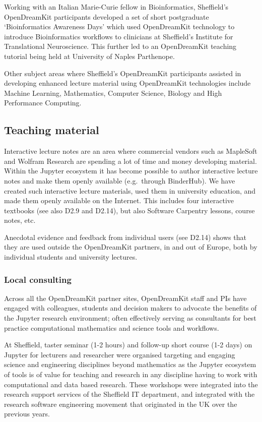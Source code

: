 \documentclass{deliverablereport}
\begin{document}
\begin{itemize}
  Working with an Italian Marie-Curie fellow in Bioinformatics,
  Sheffield's OpenDreamKit participants developed a set of short
  postgraduate `Bioinformatics Awareness Days' which used OpenDreamKit
  technology to introduce Bioinformatics workflows to clinicians at
  Sheffield's Institute for Translational Neuroscience. This further led
  to an OpenDreamKit teaching tutorial being held at University of
  Naples Parthenope.

  Other subject areas where Sheffield's OpenDreamKit participants
  assisted in developing enhanced lecture material using OpenDreamKit
  technologies include Machine Learning, Mathematics, Computer Science,
  Biology and High Performance Computing.
\end{itemize}

\hypertarget{teaching-material}{%
\subsection{Teaching material}\label{teaching-material}}

Interactive lecture notes are an area where commercial vendors such as
MapleSoft and Wolfram Research are spending a lot of time and money
developing material. Within the Jupyter ecosystem it has become possible
to author interactive lecture notes and make them openly available
(e.g.~through BinderHub). We have created such interactive lecture
materials, used them in university education, and made them openly
available on the Internet. This includes four interactive textbooks (see
also D2.9 and D2.14), but also Software Carpentry lessons, course notes,
etc.

Anecdotal evidence and feedback from individual users (see D2.14) shows
that they are used outside the OpenDreamKit partners, in and out of
Europe, both by individual students and university lectures.

\hypertarget{local-consulting}{%
\subsubsection{Local consulting}\label{local-consulting}}

Across all the OpenDreamKit partner sites, OpenDreamKit staff and PIs
have engaged with colleagues, students and decision makers to advocate
the benefits of the Jupyter research environment; often effectively
serving as consultants for best practice computational mathematics and
science tools and workflows.

At Sheffield, taster seminar (1-2 hours) and follow-up short course (1-2
days) on Jupyter for lecturers and researcher were organised targeting
and engaging science and engineering disciplines beyond mathematics as
the Jupyter ecosystem of tools is of value for teaching and research in
any discipline having to work with computational and data based
research. These workshops were integrated into the research support
services of the Sheffield IT department, and integrated with the
research software engineering movement that originated in the UK over
the previous years.
\end{document}

